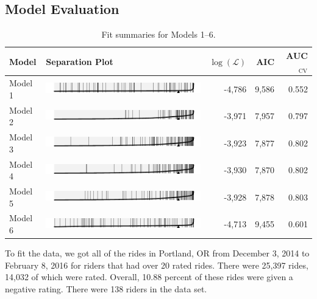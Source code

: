 \documentclass[]{article}
\begin{document}
\subsection{Model Evaluation}\label{model-evaluation}

\begin{table}[htb]
\centering
\caption{Fit summaries for Models 1--6.\label{tab:modelfits}}
\begin{tabular}{lm{4in}rrr}
\toprule
\textbf{Model} & \textbf{Separation Plot} & \textbf{$\log (\mathcal{L})$} & \textbf{AIC} &
\textbf{AUC}$_{\text{CV}}$\footnotemark\\
\midrule
Model 1 & \includegraphics{figure/model1-sep.pdf}
& -4,786 & 9,586 & 0.552\\
Model 2 & \includegraphics{figure/model2-sep.pdf}
& -3,971 & 7,957 & 0.797\\
Model 3 & \includegraphics{figure/model3-sep.pdf}
& -3,923 & 7,877 & 0.802\\
Model 4 & \includegraphics{figure/model4-sep.pdf}
& -3,930 & 7,870 & 0.802\\
Model 5 & \includegraphics{figure/model5-sep.pdf}
& -3,928 & 7,878 & 0.803\\
Model 6 & \includegraphics{figure/model6-sep.pdf}
& -4,713 & 9,455 & 0.601\\
\bottomrule
\end{tabular}
\end{table}


To fit the data, we got all of the rides in Portland, OR from December
3, 2014 to February 8, 2016 for riders that had over 20 rated rides.
There were 25,397 rides, 14,032 of which were rated. Overall, 10.88
percent of these rides were given a negative rating. There were 138
riders in the data set.
\end{document}
